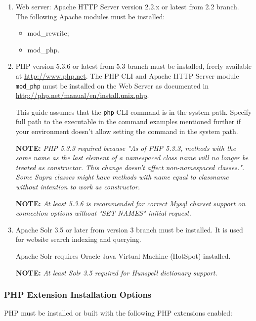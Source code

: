 \documentclass[12pt]{article}
\newcommand{\vigShowNotes}{1}
\newcommand{\note}[1]{
\textbf{NOTE:} 
\textit{#1}
}
\begin{document}
\begin{enumerate}

\item 
Web server: Apache HTTP Server version 2.2.x or latest from 2.2 branch. The following Apache modules must be installed:
\begin{itemize}
	\item mod\_rewrite;
	\item mod\_php.
\end{itemize}

\item 
PHP version 5.3.6 or latest from 5.3 branch must be installed, freely available at \url{http://www.php.net}. The PHP CLI and Apache HTTP Server module \texttt{mod\_php} must be installed on the Web Server as documented in \url{http://php.net/manual/en/install.unix.php}.

This guide assumes that the \texttt{php} CLI command is in the system path. Specify full path to the executable in the command examples mentioned further if your environment doesn't allow setting the command in the system path.

\note{PHP 5.3.3 required because "As of PHP 5.3.3, methods with the same name as the last element of a namespaced class name will no longer be treated as constructor. This change doesn't affect non-namespaced classes.". Some Supra classes might have methods with name equal to classname without intention to work as constructor.}
	
\note{At least 5.3.6 is recommended for correct Mysql charset support on connection options without "SET NAMES" initial request.}

\item
Apache Solr 3.5 or later from version 3 branch must be installed. It is used for website search indexing and querying.

Apache Solr requires Oracle Java Virtual Machine (HotSpot) installed.

\note{At least Solr 3.5 required for Hunspell dictionary support.}

\end{enumerate}

\subsubsection{PHP Extension Installation Options}

PHP must be installed or built with the following PHP extensions enabled:
\end{document}
